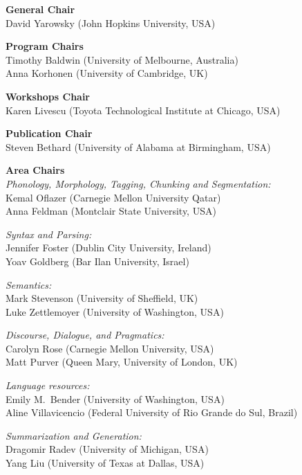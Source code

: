 {\small
\noindent
\textbf{General Chair}\\
David Yarowsky (John Hopkins University, USA)

\smallskip
\noindent
\textbf{Program Chairs}\\
Timothy Baldwin (University of Melbourne, Australia)\\
Anna Korhonen (University of Cambridge, UK)

\smallskip
\noindent
\textbf{Workshops Chair}\\
Karen Livescu (Toyota Technological Institute at Chicago, USA)

\smallskip
\noindent
\textbf{Publication Chair}\\
Steven Bethard (University of Alabama at Birmingham, USA)

\medskip
\noindent
\textbf{Area Chairs}\\
\textit{Phonology, Morphology, Tagging, Chunking and Segmentation:}\\
  Kemal Oflazer (Carnegie Mellon University Qatar)\\
  Anna Feldman (Montclair State University, USA)

\smallskip
\noindent
\textit{Syntax and Parsing:}\\
  Jennifer Foster (Dublin City University, Ireland)\\
  Yoav Goldberg (Bar Ilan University, Israel)

\smallskip
\noindent
\textit{Semantics:}\\
  Mark Stevenson (University of Sheffield, UK)\\
  Luke Zettlemoyer (University of Washington, USA)

\smallskip
\noindent
\textit{Discourse, Dialogue, and Pragmatics:}\\
  Carolyn Rose (Carnegie Mellon University, USA)\\
  Matt Purver (Queen Mary, University of London, UK)

\smallskip
\noindent
\textit{Language resources:}\\
  Emily M.\ Bender (University of Washington, USA)\\
  Aline Villavicencio (Federal University of Rio Grande do Sul, Brazil)

\smallskip
\noindent
\textit{Summarization and Generation:}\\
  Dragomir Radev (University of Michigan, USA)\\
  Yang Liu (University of Texas at Dallas, USA)

}
